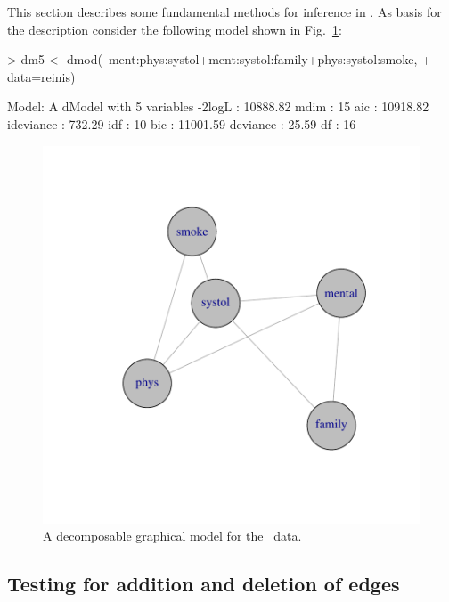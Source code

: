 \documentclass[12pt]{article}
\begin{document}
This section describes some fundamental methods for inference in
\grim. As basis for the description consider the following model shown
in Fig.~\ref{fig:fundamentalfig1}:

\begin{Schunk}
\begin{Sinput}
> dm5 <- dmod(~ment:phys:systol+ment:systol:family+phys:systol:smoke,
+             data=reinis)
\end{Sinput}
\begin{Soutput}
Model: A dModel with 5 variables
 -2logL    :       10888.82 mdim :   15 aic :     10918.82 
 ideviance :         732.29 idf  :   10 bic :     11001.59 
 deviance  :          25.59 df   :   16 
\end{Soutput}
\end{Schunk}


\begin{figure}[h]
  \centering
  \includegraphics[]{figures/GRIM-fundamentalfig1}
  \caption{A decomposable graphical model for the \reinis\ data.}
  \label{fig:fundamentalfig1}
\end{figure}


\subsection{Testing for addition and deletion of edges}
\label{sec:xxx}
\end{document}
